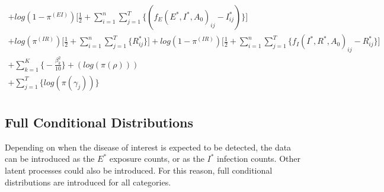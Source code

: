 \documentclass[12pt]{article}
\begin{document}
\begin{center}
\begin{multline}
            + log(1-\pi^{(EI)})\Big[\frac{1}{2} + \sum_{i=1}^n\sum_{j=1}^T\{(f_E(E^*, I^*, A_0)_{ij} - I^*_{ij})\}\Big]\\
            + log(\pi^{(IR)})\Big[\frac{1}{2} + \sum_{i=1}^n\sum_{j=1}^T\{R^*_{ij}\}\Big] + 
            log(1-\pi^{(IR)})\Big[\frac{1}{2} + \sum_{i=1}^n\sum_{j=1}^T\{ f_I(I^*, R^*, A_0)_{ij} - R^*_{ij}\}\Big]\\
            + \sum_{k = 1}^K\bigg\{-\frac{\beta^2_k}{10}\bigg\}
            + (log(\pi(\rho)))\\
            + \sum_{j=1}^{T} \bigg\{ log(\pi(\gamma_j)) \bigg\}\\
\end{multline}

\end{center}


\subsection{Full Conditional Distributions}
Depending on when the disease of interest is expected to be detected, the data can be 
introduced as the $E^*$ exposure counts, or as the $I^*$ infection counts. Other latent 
processes could also be introduced. For this reason, full conditional distributions are 
introduced for all categories. 
\end{document}
